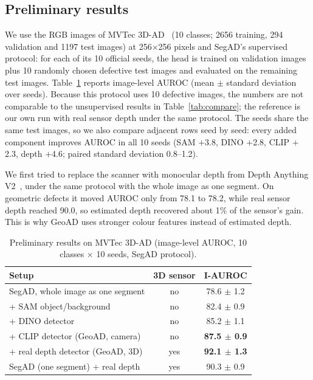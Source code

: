 \documentclass[conference]{IEEEtran}
\begin{document}
\subsection{Preliminary results}
We use the RGB images of MVTec 3D-AD~\cite{mvtec3d} (10 classes; 2656 training, 294 validation and 1197 test images) at 256$\times$256 pixels and SegAD's supervised protocol: for each of its 10 official seeds, the head is trained on validation images plus 10 randomly chosen defective test images and evaluated on the remaining test images. Table~\ref{tab:results} reports image-level AUROC (mean $\pm$ standard deviation over seeds). Because this protocol uses 10 defective images, the numbers are not comparable to the unsupervised results in Table~\ref{tab:compare}; the reference is our own run with real sensor depth under the same protocol. The seeds share the same test images, so we also compare adjacent rows seed by seed: every added component improves AUROC in all 10 seeds (SAM $+$3.8, DINO $+$2.8, CLIP $+$2.3, depth $+$4.6; paired standard deviation 0.8--1.2).

We first tried to replace the scanner with monocular depth from Depth Anything V2~\cite{dav2}, under the same protocol with the whole image as one segment. On geometric defects it moved AUROC only from 78.1 to 78.2, while real sensor depth reached 90.0, so estimated depth recovered about 1\% of the sensor's gain. This is why GeoAD uses stronger colour features instead of estimated depth.

\begin{table}[t]
\centering
\caption{Preliminary results on MVTec 3D-AD (image-level AUROC, 10 classes $\times$ 10 seeds, SegAD protocol).}
\label{tab:results}
\small
\begin{tabular}{lcc}
\toprule
Setup & 3D sensor & I-AUROC \\
\midrule
SegAD, whole image as one segment & no & 78.6 $\pm$ 1.2 \\
\quad + SAM object/background & no & 82.4 $\pm$ 0.9 \\
\quad + DINO detector & no & 85.2 $\pm$ 1.1 \\
\quad + CLIP detector (GeoAD, camera) & no & \textbf{87.5 $\pm$ 0.9} \\
\quad + real depth detector (GeoAD, 3D) & yes & \textbf{92.1 $\pm$ 1.3} \\
\midrule
SegAD (one segment) + real depth & yes & 90.3 $\pm$ 0.9 \\
\bottomrule
\end{tabular}
\end{table}
\end{document}
